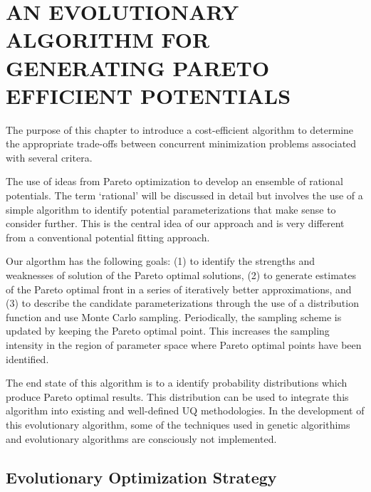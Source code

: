 \chapter{AN EVOLUTIONARY ALGORITHM FOR GENERATING PARETO EFFICIENT POTENTIALS}
\label{ch:methodology}

The purpose of this chapter to introduce a cost-efficient algorithm to determine the appropriate trade-offs between concurrent minimization problems associated with several critera.

The use of ideas from Pareto optimization to develop an ensemble of rational potentials. The term ‘rational’ will be discussed in detail but involves the use of a simple algorithm to identify potential parameterizations that make sense to consider further. This is the central idea of our approach and is very different from a conventional potential fitting approach.

Our algorthm has the following goals: (1) to identify the strengths and weaknesses of solution of the Pareto optimal solutions, (2) to generate estimates of the Pareto optimal front in a series of iteratively better approximations, and (3) to describe the candidate parameterizations through the use of a distribution function and use Monte Carlo sampling.  Periodically, the sampling scheme is updated by keeping the Pareto optimal point.  This increases the sampling intensity in the region of parameter space where Pareto optimal points have been identified.

The end state of this algorithm is to a identify probability distributions which produce Pareto optimal results.  This distribution can be used to integrate this algorithm into existing and well-defined UQ methodologies.  In the development of this evolutionary algorithm, some of the techniques used in genetic algorithims and evolutionary algorithms are consciously not implemented.

\section{Evolutionary Optimization Strategy}
\label{sec:strategy}


